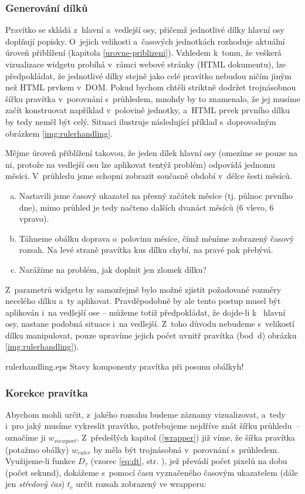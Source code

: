 			\subsubsection*{Generování dílků}
				Pravítko se skládá z~hlavní a~vedlejší osy, přičemž jednotlivé dílky hlavní osy doplňují popisky. O~jejich velikosti a~časových jednotkách rozhoduje aktuální úroveň přiblížení (kapitola \ref{urovne-priblizeni}). Vzhledem k~tomu, že veškerá vizualizace wid\-getu probíhá v~rámci webové stránky (HTML dokumentu), lze předpokládat, že jednotlivé dílky stejně jako celé pravítko nebudou ničím jiným než HTML prvkem v~DOM. Pokud bychom chtěli striktně dodržet trojnásobnou šířku pravítka v~porovnání s~průhledem, mnohdy by to znamenalo, že jej musíme začít konstruovat například v~polovině jednotky, a~HTML prvek prvního dílku by tedy neměl být celý. Situaci ilustruje následující příklad s~doprovodným obrázkem \ref{img:rulerhandling}.
				
				Mějme úroveň přiblížení takovou, že jeden dílek hlavní osy (omezíme se pouze na ni, protože na vedlejší osu lze aplikovat tentýž problém) odpovídá jednomu měsíci. V~průhledu jsme schopni zobrazit současně období v~délce šesti měsíců.
				\begin{enumerate}[a)]
					\item Nastavili jsme časový ukazatel na přesný začátek měsíce (tj. půlnoc prvního dne), mimo průhled je tedy načteno dalších dvanáct měsíců (6 vlevo, 6 vpravo).
					\item Táhneme obálku doprava o~polovinu měsíce, čímž měníme zobrazený časový rozsah. Na levé straně pravítka kus dílku chybí, na pravé pak přebývá.
					\item Narážíme na problém, jak doplnit jen zlomek dílku?
				\end{enumerate}
				
				Z~parametrů widgetu by samozřejmě bylo možné zjistit požadované rozměry necelého dílku a~ty aplikovat. Pravděpodobně by ale tento postup musel být aplikován i~na vedlejší ose -- můžeme totiž předpokládat, že dojde-li k~ hlavní osy, nastane podobná situace i~na vedlejší. Z~toho důvodu nebudeme s~velikostí dílku manipulovat, pouze upravíme jejich počet uvnitř pravítka (bod~d) obrázku \ref{img:rulerhandling}).
				
					{}{rulerhandling.eps}
					{Stavy komponenty pravítka při posunu obálky}{h!}
				
			\subsubsection*{Korekce pravítka}
				Abychom mohli určit, z~jakého rozsahu budeme záznamy vizualizovat, a~tedy i~pro jaký musíme vykreslit pravítko, potřebujeme nejdříve znát šířku průhledu~-- označíme ji $w_{viewport}$. Z~předešlých kapitol (\ref{wrapper}) již víme, že šířka pravítka (potažmo obálky) $w_{ruler}$ by měla být trojnásobná v~porovnání s~průhledem.
				Využijeme-li funkce $D_\tau$ (vzorec \ref{eq:dt}, str. \pageref{eq:dt}), jež převádí počet pixelů na dobu (počet sekund), dokážeme s~pomocí času vyznačeného časovým ukazatelem (dále jen \emph{středový čas}) $t_c$ určit rozsah zobrazený ve wrapperu:
				
